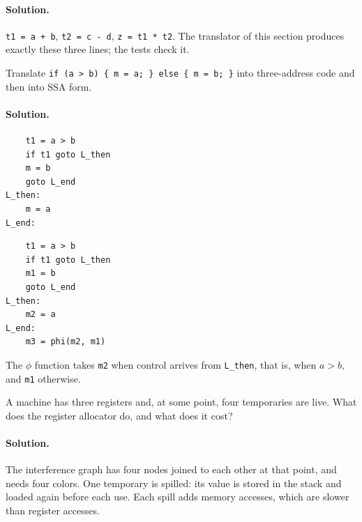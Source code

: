 \paragraph{Solution.}
\texttt{t1 = a + b}, \texttt{t2 = c - d}, \texttt{z = t1 * t2}. The translator
of this section produces exactly these three lines; the tests check it.

\begin{exercise}
Translate \texttt{if (a > b) \{ m = a; \} else \{ m = b; \}} into three-address
code and then into SSA form.
\end{exercise}

\paragraph{Solution.}
\begin{center}
\begin{minipage}[t]{0.4\textwidth}
\begin{lstlisting}
    t1 = a > b
    if t1 goto L_then
    m = b
    goto L_end
L_then:
    m = a
L_end:
\end{lstlisting}
\end{minipage}
\hspace{1cm}
\begin{minipage}[t]{0.4\textwidth}
\begin{lstlisting}
    t1 = a > b
    if t1 goto L_then
    m1 = b
    goto L_end
L_then:
    m2 = a
L_end:
    m3 = phi(m2, m1)
\end{lstlisting}
\end{minipage}
\end{center}
The $\phi$ function takes \texttt{m2} when control arrives from
\texttt{L\_then}, that is, when $a > b$, and \texttt{m1} otherwise.

\begin{exercise}
A machine has three registers and, at some point, four temporaries are live.
What does the register allocator do, and what does it cost?
\end{exercise}

\paragraph{Solution.} The interference graph has four nodes joined to each
other at that point, and needs four colors. One temporary is spilled: its
value is stored in the stack and loaded again before each use. Each spill adds
memory accesses, which are slower than register accesses.
